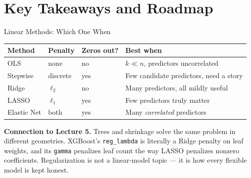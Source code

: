 \documentclass[aspectratio=169, 11pt]{beamer}
\begin{document}
\section{Key Takeaways and Roadmap}


\begin{frame}{Linear Methods: Which One When}
  \begin{center}
    {\small
    \begin{tabular}{llll}
      \toprule
      \textbf{Method} & \textbf{Penalty} & \textbf{Zeros out?} & \textbf{Best when} \\
      \midrule
      OLS & none & no & $k \ll n$, predictors uncorrelated \\
      Stepwise & discrete & yes & Few candidate predictors, need a story \\
      Ridge & $\ell_2$ & no & Many predictors, all mildly useful \\
      LASSO & $\ell_1$ & yes & Few predictors truly matter \\
      Elastic Net & both & yes & Many \emph{correlated} predictors \\
      \bottomrule
    \end{tabular}
    }
  \end{center}
  \begin{keybox}
    \small \textbf{Connection to Lecture 5.} Trees and shrinkage solve the same
    problem in different geometries. XGBoost's \texttt{reg\_lambda} is
    literally a Ridge penalty on leaf weights, and its \texttt{gamma} penalizes
    leaf count the way LASSO penalizes nonzero coefficients. Regularization is
    not a linear-model topic --- it is how every flexible model is kept honest.
  \end{keybox}
\end{frame}
\end{document}

